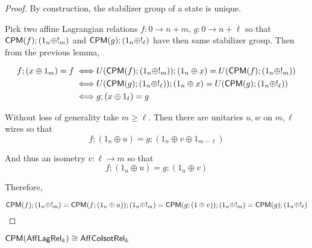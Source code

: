 \begin{proof}
By construction, the stabilizer group of a state is unique.

Pick two  affine Lagrangian relations $f:0\to n+m$, $g:0\to n+\ell$ so that $\mathsf{CPM}(f);(1_n \oplus !_m)$ and $\mathsf{CPM}(g);(1_n \oplus !_\ell)$ have then same stabilizer group.  Then from the previous lemma,

\begin{align*}
  f; (x \oplus 1_m) = f
 \iff &
U(\mathsf{CPM}(f);(1_n \oplus !_m)); (1_n \oplus x) = U(\mathsf{CPM}(f);(1_n \oplus !_m))\\
\iff & U(\mathsf{CPM}(g);(1_n \oplus !_\ell)); (1_n \oplus x) = U(\mathsf{CPM}(g);(1_n \oplus !_\ell))\\
\iff & g; (x \oplus 1_\ell) = g
\end{align*}



Without loss of generality take $m\geq \ell$.
Then there are unitaries $u,w$ on $m,\ell$ wires so that
$$f;(1_n\oplus u) = g; (1_n\oplus v \oplus 1_{m-\ell})$$

And thus an isometry $v:\ell\to m$ so that
$$f;(1_n\oplus u) = g; (1_n\oplus v)$$

Therefore,

$$
 \mathsf{CPM} (f);(1_n \oplus !_m) 
=\mathsf{CPM} (f;(1_n\oplus u) );(1_n \oplus !_m) 
=\mathsf{CPM} (g;(1\oplus v) );(1_n \oplus !_m)
= \mathsf{CPM} (g);(1_n \oplus !_\ell) 
$$
\end{proof}




\begin{theorem}
 $\mathsf{CPM}(\mathsf{Aff}\mathsf{Lag}\mathsf{Rel}_k) \cong \mathsf{Aff}{\sf Co}{\sf Isot}\mathsf{Rel}_k$
\end{theorem}


